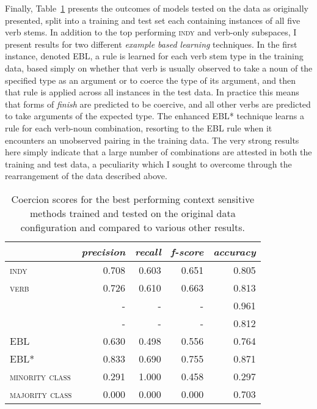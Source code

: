 Finally, Table~\ref{tab:coerpare} presents the outcomes of models tested on the data as originally presented, split into a training and test set each containing instances of all five verb stems.  In addition to the top performing \textsc{indy} and verb-only subspaces, I present results for two different \emph{example based learning} techniques.  In the first instance, denoted \textsc{EBL}, a rule is learned for each verb stem type in the training data, based simply on whether that verb is usually observed to take a noun of the specified type as an argument or to coerce the type of its argument, and then that rule is applied across all instances in the test data.  In practice this means that forms of \emph{finish} are predicted to be coercive, and all other verbs are predicted to take arguments of the expected type.  The enhanced \textsc{EBL*} technique learns a rule for each verb-noun combination, resorting to the \textsc{EBL} rule when it encounters an unobserved pairing in the training data.  The very strong results here simply indicate that a large number of combinations are attested in both the training and test data, a peculiarity which I sought to overcome through the rearrangement of the data described above.

\begin{table}
\centering
\begin{tabular}{lrrrr}
\hline
& \emph{precision} & \emph{recall} & \emph{f-score} & \emph{accuracy} \\
\hline
\textsc{indy} & 0.708 & 0.603 & 0.651 & 0.805 \\
\textsc{verb} & 0.726 & 0.610 & 0.663 & 0.813 \\
\cite{RobertsEA2010} & - & - & - & 0.961 \\
\cite{RobertsEA2011} & - & - & - & 0.812 \\
\textsc{EBL} & 0.630 & 0.498 & 0.556 & 0.764 \\
\textsc{EBL*} & 0.833 & 0.690 & 0.755 & 0.871 \\
\textsc{minority class} & 0.291 & 1.000 & 0.458 & 0.297 \\
\textsc{majority class} & 0.000 & 0.000 & 0.000 & 0.703 \\
\hline
\end{tabular}
\caption[Coercion Scores Compared Against Other Methods]{Coercion scores for the best performing context sensitive methods trained and tested on the original data configuration and compared to various other results.}
\label{tab:coerpare}
\end{table}

